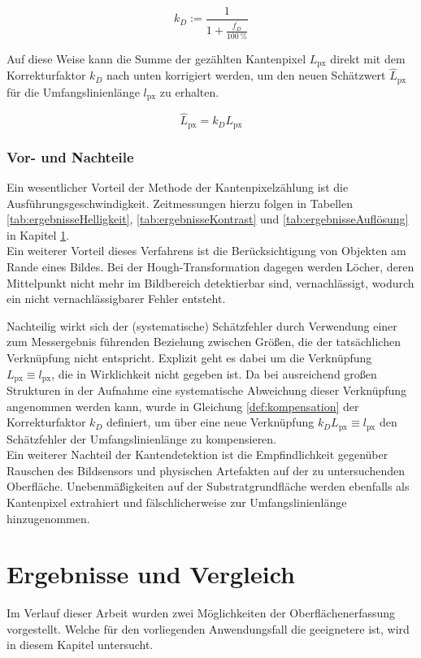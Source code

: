 \documentclass[accentcolor=tud1c, 11pt, toc=bib, toc=listof, captions=abovetable, parskip=half]{tudreport}
\begin{document}
\begin{equation}
k_D := \frac{1}{1+\frac{\overline{f_D}}{\SI{100}{\percent}}}
\label{def:kompensation}
\end{equation}

Auf diese Weise kann die Summe der gezählten Kantenpixel $L_{\text{px}}$ direkt mit dem Korrekturfaktor $k_D$ nach unten korrigiert werden, um den neuen Schätzwert $\hat{L}_{\text{px}}$ für die Umfangslinienlänge $l_{\text{px}}$ zu erhalten.

\begin{equation}
\hat{L}_{\text{px}} = k_DL_{\text{px}}
\end{equation}

\subsection{Vor- und Nachteile}
Ein wesentlicher Vorteil der Methode der Kantenpixelzählung ist die Ausführungsgeschwindigkeit. Zeitmessungen hierzu folgen in Tabellen \ref{tab:ergebnisseHelligkeit}, \ref{tab:ergebnisseKontrast} und \ref{tab:ergebnisseAuflösung} in Kapitel \ref{ch:vergleichDerErgebnisse}.\\
Ein weiterer Vorteil dieses Verfahrens ist die Berücksichtigung von Objekten am Rande eines Bildes. Bei der Hough-Transformation dagegen werden Löcher, deren Mittelpunkt nicht mehr im Bildbereich detektierbar sind, vernachlässigt, wodurch ein nicht vernachlässigbarer Fehler entsteht.

Nachteilig wirkt sich der (systematische) Schätzfehler durch Verwendung einer zum Messergebnis führenden Beziehung zwischen Größen, die der tatsächlichen Verknüpfung nicht entspricht. Explizit geht es dabei um die Verknüpfung $L_{\text{px}} \equiv l_{\text{px}}$, die in Wirklichkeit nicht gegeben ist. Da bei ausreichend großen Strukturen in der Aufnahme eine systematische Abweichung dieser Verknüpfung angenommen werden kann, wurde in Gleichung \ref{def:kompensation} der Korrekturfaktor $k_D$ definiert, um über eine neue Verknüpfung $k_DL_{\text{px}} \equiv l_{\text{px}}$ den Schätzfehler der Umfangslinienlänge zu kompensieren.\\
Ein weiterer Nachteil der Kantendetektion ist die Empfindlichkeit gegenüber Rauschen des Bildsensors und physischen Artefakten auf der zu untersuchenden Oberfläche. Unebenmäßigkeiten auf der Substratgrundfläche werden ebenfalls als Kantenpixel extrahiert und fälschlicherweise zur Umfangslinienlänge hinzugenommen.

\chapter{Ergebnisse und Vergleich}
\label{ch:vergleichDerErgebnisse}
Im Verlauf dieser Arbeit wurden zwei Möglichkeiten der Oberflächenerfassung vorgestellt. Welche für den vorliegenden Anwendungsfall die geeignetere ist, wird in diesem Kapitel untersucht.
\end{document}
